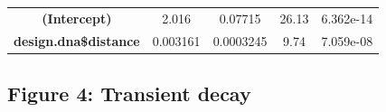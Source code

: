 \documentclass[]{article}
\newenvironment{Shaded}{\begin{snugshade}}{\end{snugshade}}
\newcommand{\CommentTok}[1]{\textcolor[rgb]{0.56,0.35,0.01}{\textit{#1}}}
\begin{document}
\begin{longtable}[]{@{}ccccc@{}}
\begin{minipage}[b]{0.13\columnwidth}
\end{minipage}\tabularnewline
\midrule
\endhead
\begin{minipage}[t]{0.31\columnwidth}\centering\strut
\textbf{(Intercept)}\strut
\end{minipage} & \begin{minipage}[t]{0.13\columnwidth}\centering\strut
2.016\strut
\end{minipage} & \begin{minipage}[t]{0.16\columnwidth}\centering\strut
0.07715\strut
\end{minipage} & \begin{minipage}[t]{0.12\columnwidth}\centering\strut
26.13\strut
\end{minipage} & \begin{minipage}[t]{0.13\columnwidth}\centering\strut
6.362e-14\strut
\end{minipage}\tabularnewline
\begin{minipage}[t]{0.31\columnwidth}\centering\strut
\textbf{design.dna\$distance}\strut
\end{minipage} & \begin{minipage}[t]{0.13\columnwidth}\centering\strut
0.003161\strut
\end{minipage} & \begin{minipage}[t]{0.16\columnwidth}\centering\strut
0.0003245\strut
\end{minipage} & \begin{minipage}[t]{0.12\columnwidth}\centering\strut
9.74\strut
\end{minipage} & \begin{minipage}[t]{0.13\columnwidth}\centering\strut
7.059e-08\strut
\end{minipage}\tabularnewline
\bottomrule
\end{longtable}

\begin{Shaded}
\end{Shaded}

\subsection{Figure 4: Transient decay}\label{figure-4-transient-decay}
\end{document}
